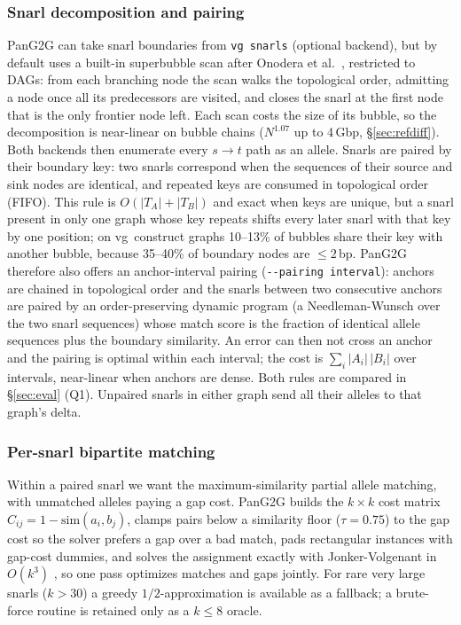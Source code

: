 \subsubsection{Snarl decomposition and pairing}
PanG2G can take snarl boundaries from \texttt{vg snarls} \cite{garrison2018vg} (optional backend), but by default uses a built-in superbubble scan after Onodera et al.\ \cite{onodera2013superbubbles}, restricted to DAGs: from each branching node the scan walks the topological order, admitting a node once all its predecessors are visited, and closes the snarl at the first node that is the only frontier node left. Each scan costs the size of its bubble, so the decomposition is near-linear on bubble chains ($N^{1.07}$ up to 4\,Gbp, \S\ref{sec:refdiff}). Both backends then enumerate every $s\!\to\!t$ path as an allele. Snarls are paired by their boundary key: two snarls correspond when the sequences of their source and sink nodes are identical, and repeated keys are consumed in topological order (FIFO). This rule is $O(|T_A|+|T_B|)$ and exact when keys are unique, but a snarl present in only one graph whose key repeats shifts every later snarl with that key by one position; on vg~construct graphs 10--13\% of bubbles share their key with another bubble, because 35--40\% of boundary nodes are ${\le}2$\,bp. PanG2G therefore also offers an anchor-interval pairing (\texttt{-{}-pairing interval}): anchors are chained in topological order and the snarls between two consecutive anchors are paired by an order-preserving dynamic program (a Needleman-Wunsch over the two snarl sequences) whose match score is the fraction of identical allele sequences plus the boundary similarity. An error can then not cross an anchor and the pairing is optimal within each interval; the cost is $\sum_i|A_i|\,|B_i|$ over intervals, near-linear when anchors are dense. Both rules are compared in \S\ref{sec:eval} (Q1). Unpaired snarls in either graph send all their alleles to that graph's delta.

\subsubsection{Per-snarl bipartite matching}
Within a paired snarl we want the maximum-similarity partial allele matching, with unmatched alleles paying a gap cost. PanG2G builds the $k\times k$ cost matrix $C_{ij}=1-\mathrm{sim}(a_i,b_j)$, clamps pairs below a similarity floor ($\tau=0.75$) to the gap cost so the solver prefers a gap over a bad match, pads rectangular instances with gap-cost dummies, and solves the assignment exactly with Jonker-Volgenant in $O(k^3)$ \cite{jonker1987shortest}, so one pass optimizes matches and gaps jointly. For rare very large snarls ($k>30$) a greedy $1/2$-approximation is available as a fallback; a brute-force routine is retained only as a $k\le 8$ oracle.

